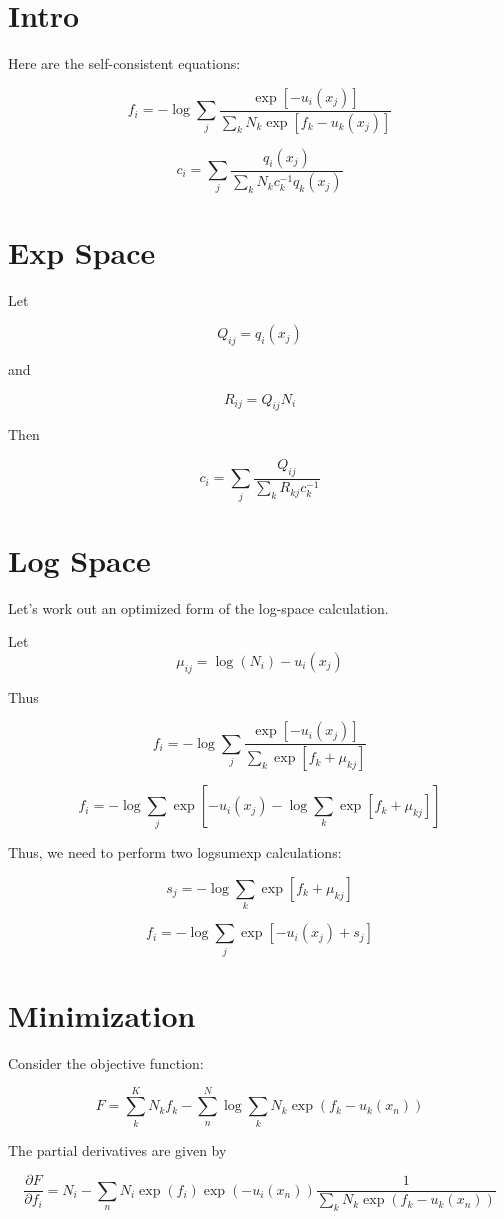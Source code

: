 \documentclass[12pt]{article}
\begin{document}
\section{Intro}

Here are the self-consistent equations:

$$f_i = -\log \sum_j \frac{\exp[-u_i(x_j)]}{\sum_k N_k \exp[f_k - u_k(x_j)]}$$

$$c_i = \sum_j \frac{q_i(x_j)}{\sum_k N_k c_k^{-1} q_k(x_j)}$$

\section{Exp Space}

Let

$$Q_{ij} = q_i(x_j)$$

and 

$$R_{ij} = Q_{ij} N_i$$

Then 

$$c_i = \sum_j \frac{Q_{ij}}{\sum_k R_{kj} c_k^{-1}}$$


\section{Log Space}

Let's work out an optimized form of the log-space calculation.  

Let 
$$\mu_{ij} = \log(N_i) -u_i(x_j)$$

Thus

$$f_i = -\log \sum_j \frac{\exp[-u_i(x_j)]}{\sum_k \exp[f_k + \mu_{kj}]}$$

$$f_i = -\log \sum_j \exp[-u_i(x_j) - \log \sum_k \exp[f_k + \mu_{kj}]]$$

Thus, we need to perform two logsumexp calculations:

$$s_j = -\log \sum_k \exp[f_k + \mu_{kj}]$$

$$f_i = -\log \sum_j \exp[-u_i(x_j) + s_j]$$

\section{Minimization}

Consider the objective function:

$$F = \sum_k^K N_k f_k - \sum_n^N \log \sum_k N_k \exp(f_k - u_k(x_n))$$

The partial derivatives are given by 

$$\frac{\partial F}{\partial f_i} = N_i - \sum_n N_i \exp(f_i) \exp(-u_i(x_n)) \frac{1}{\sum_k N_k \exp(f_k - u_k(x_n))}$$
\end{document}
